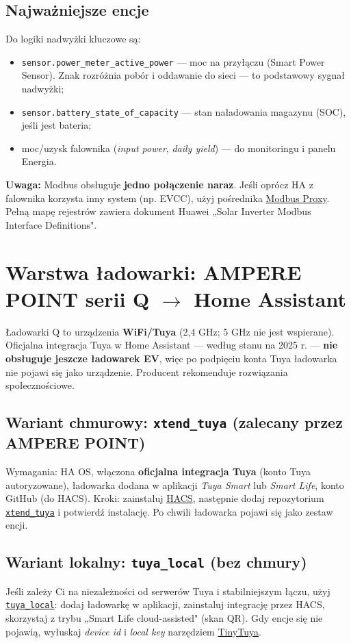 \documentclass[11pt]{article}
\newcommand{\key}[1]{\textbf{\color{navy}#1}}
\begin{document}
\subsection{Najważniejsze encje}
Do logiki nadwyżki kluczowe są:
\begin{itemize}
\item \verb|sensor.power_meter_active_power| — moc na przyłączu (Smart Power Sensor). Znak rozróżnia pobór i oddawanie do sieci — to podstawowy sygnał nadwyżki;
\item \verb|sensor.battery_state_of_capacity| — stan naładowania magazynu (SOC), jeśli jest bateria;
\item moc/uzysk falownika (\emph{input power}, \emph{daily yield}) — do monitoringu i panelu Energia.
\end{itemize}
\key{Uwaga:} Modbus obsługuje \key{jedno połączenie naraz}. Jeśli oprócz HA z falownika korzysta inny system (np. EVCC), użyj pośrednika \href{https://github.com/Akulatraxas/ha-modbusproxy}{Modbus Proxy}. Pełną mapę rejestrów zawiera dokument Huawei „Solar Inverter Modbus Interface Definitions".

\section{Warstwa ładowarki: AMPERE POINT serii Q \texorpdfstring{$\rightarrow$}{->} Home Assistant}
Ładowarki Q to urządzenia \key{WiFi/Tuya} (2,4 GHz; 5 GHz nie jest wspierane). Oficjalna integracja Tuya w Home Assistant — według stanu na 2025 r. — \key{nie obsługuje jeszcze ładowarek EV}, więc po podpięciu konta Tuya ładowarka nie pojawi się jako urządzenie. Producent rekomenduje rozwiązania społecznościowe.

\subsection{Wariant chmurowy: \texttt{xtend\_tuya} (zalecany przez AMPERE POINT)}
Wymagania: HA OS, włączona \key{oficjalna integracja Tuya} (konto Tuya autoryzowane), ładowarka dodana w aplikacji \emph{Tuya Smart} lub \emph{Smart Life}, konto GitHub (do HACS). Kroki: zainstaluj \href{https://hacs.xyz/docs/setup/download/}{HACS}, następnie dodaj repozytorium \href{https://github.com/azerty9971/xtend_tuya}{\texttt{xtend\_tuya}} i potwierdź instalację. Po chwili ładowarka pojawi się jako zestaw encji.

\subsection{Wariant lokalny: \texttt{tuya\_local} (bez chmury)}
Jeśli zależy Ci na niezależności od serwerów Tuya i stabilniejszym łączu, użyj \href{https://github.com/make-all/tuya-local}{\texttt{tuya\_local}}: dodaj ładowarkę w aplikacji, zainstaluj integrację przez HACS, skorzystaj z trybu „Smart Life cloud-assisted" (skan QR). Gdy encje się nie pojawią, wyłuskaj \emph{device id} i \emph{local key} narzędziem \href{https://github.com/jasonacox/tinytuya}{TinyTuya}.
\end{document}
